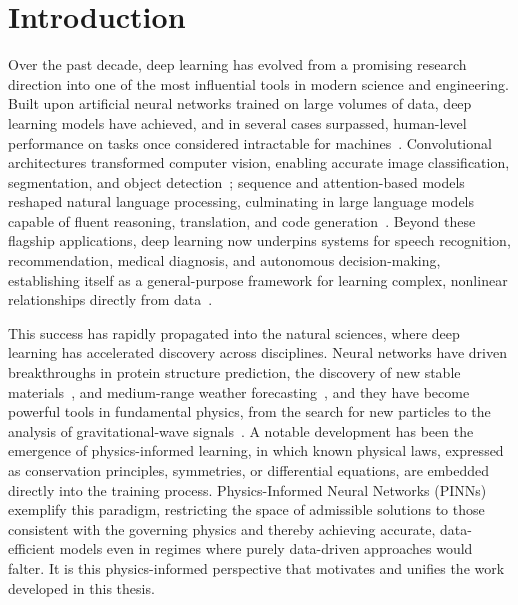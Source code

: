 \chapter*{Introduction}
\label{sec:introduction}

Over the past decade, deep learning has evolved from a promising research direction into one of the most influential tools in modern science and engineering. Built upon artificial neural networks trained on large volumes of data, deep learning models have achieved, and in several cases surpassed, human-level performance on tasks once considered intractable for machines~\cite{Silver2016}. Convolutional architectures transformed computer vision, enabling accurate image classification, segmentation, and object detection~\cite{oshea2015}; sequence and attention-based models reshaped natural language processing, culminating in large language models capable of fluent reasoning, translation, and code generation~\cite{Goodfellow2016}. Beyond these flagship applications, deep learning now underpins systems for speech recognition, recommendation, medical diagnosis, and autonomous decision-making, establishing itself as a general-purpose framework for learning complex, nonlinear relationships directly from data~\cite{Ruder2016}.

This success has rapidly propagated into the natural sciences, where deep learning has accelerated discovery across disciplines. Neural networks have driven breakthroughs in protein structure prediction, the discovery of new stable materials~\cite{merchant2023}, and medium-range weather forecasting~\cite{lam2023}, and they have become powerful tools in fundamental physics, from the search for new particles to the analysis of gravitational-wave signals~\cite{karagiorgi_2022}. A notable development has been the emergence of physics-informed learning, in which known physical laws, expressed as conservation principles, symmetries, or differential equations, are embedded directly into the training process. Physics-Informed Neural Networks (PINNs)~\cite{Raissi2019, karniadakis2021} exemplify this paradigm, restricting the space of admissible solutions to those consistent with the governing physics and thereby achieving accurate, data-efficient models even in regimes where purely data-driven approaches would falter. It is this physics-informed perspective that motivates and unifies the work developed in this thesis.

